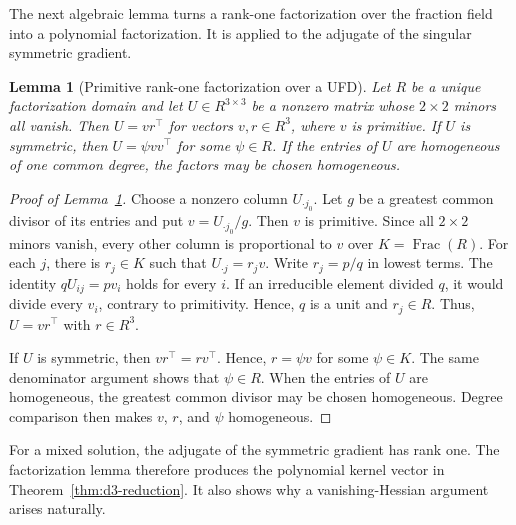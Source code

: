 \documentclass[12pt,a4paper]{article}
\theoremstyle{plain}
\newtheorem{lemma}{Lemma}
\theoremstyle{definition}
\begin{document}
The next algebraic lemma turns a rank-one factorization over the fraction field into a polynomial factorization.
It is applied to the adjugate of the singular symmetric gradient.

\begin{lemma}[Primitive rank-one factorization over a UFD]
\label{lem:ufd-rankone}
    Let $R$ be a unique factorization domain and let $U\in R^{3\times3}$ be a nonzero matrix whose $2\times2$ minors all vanish.
    Then $U=vr^\top$ for vectors $v,r\in R^3$, where $v$ is primitive.
    If $U$ is symmetric, then $U=\psi vv^\top$ for some $\psi\in R$.
    If the entries of $U$ are homogeneous of one common degree, the factors may be chosen homogeneous.
\end{lemma}

\begin{proof}[Proof of Lemma~\ref{lem:ufd-rankone}]
    Choose a nonzero column $U_{\cdot j_0}$.
    Let $g$ be a greatest common divisor of its entries and put $v=U_{\cdot j_0}/g$.
    Then $v$ is primitive.
    Since all $2\times2$ minors vanish, every other column is proportional to $v$ over $K=\operatorname{Frac}(R)$.
    For each $j$, there is $r_j\in K$ such that $U_{\cdot j}=r_jv$.
    Write $r_j=p/q$ in lowest terms.
    The identity $qU_{ij}=pv_i$ holds for every $i$.
    If an irreducible element divided $q$, it would divide every $v_i$, contrary to primitivity.
    Hence, $q$ is a unit and $r_j\in R$.
    Thus, $U=vr^\top$ with $r\in R^3$.

    If $U$ is symmetric, then $vr^\top=rv^\top$.
    Hence, $r=\psi v$ for some $\psi\in K$.
    The same denominator argument shows that $\psi\in R$.
    When the entries of $U$ are homogeneous, the greatest common divisor may be chosen homogeneous.
    Degree comparison then makes $v$, $r$, and $\psi$ homogeneous.
\end{proof}

For a mixed solution, the adjugate of the symmetric gradient has rank one.
The factorization lemma therefore produces the polynomial kernel vector in Theorem~\ref{thm:d3-reduction}.
It also shows why a vanishing-Hessian argument arises naturally.
\end{document}
